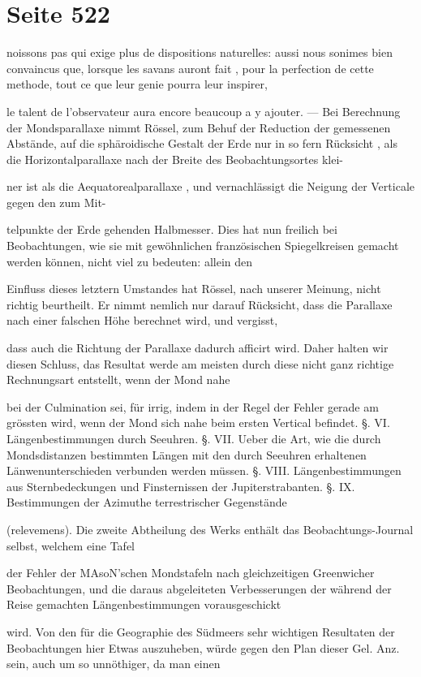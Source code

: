\documentclass[10pt,a4paper]{article}
\begin{document}
\newpage
\section*{Seite 522}
noissons pas qui exige plus de dispositions naturelles: aussi nous sonimes bien convaincus que, lorsque les savans auront fait , pour la perfection de cette methode, tout ce que leur genie pourra leur inspirer,

le talent de l'observateur aura encore beaucoup a y ajouter. — Bei Berechnung der Mondsparallaxe nimmt Rössel, zum Behuf der Reduction der gemessenen Abstände, auf die sphäroidische Gestalt der Erde nur in so fern Rücksicht , als die Horizontalparallaxe nach der Breite des Beobachtungsortes klei-

ner ist als die Aequatorealparallaxe , und vernachlässigt die Neigung der Verticale gegen den zum Mit-

telpunkte der Erde gehenden Halbmesser. Dies hat nun freilich bei Beobachtungen, wie sie mit gewöhnlichen französischen Spiegelkreisen gemacht werden können, nicht viel zu bedeuten: allein den

Einfluss dieses letztern Umstandes hat Rössel, nach unserer Meinung, nicht richtig beurtheilt. Er nimmt nemlich nur darauf Rücksicht, dass die Parallaxe nach einer falschen Höhe berechnet wird, und vergisst,

dass auch die Richtung der Parallaxe dadurch afficirt wird. Daher halten wir diesen Schluss, das Resultat werde am meisten durch diese nicht ganz richtige Rechnungsart entstellt, wenn der Mond nahe

bei der Culmination sei, für irrig, indem in der Regel der Fehler gerade am grössten wird, wenn der Mond sich nahe beim ersten Vertical befindet. §. VI. Längenbestimmungen durch Seeuhren. §. VII. Ueber die Art, wie die durch Mondsdistanzen bestimmten Längen mit den durch Seeuhren erhaltenen Länwenunterschieden verbunden werden müssen. §. VIII. Längenbestimmungen aus Sternbedeckungen und Finsternissen der Jupiterstrabanten. §. IX. Bestimmungen der Azimuthe terrestrischer Gegenstände

(relevemens). Die zweite Abtheilung des Werks enthält das Beobachtungs-Journal selbst, welchem eine Tafel

der Fehler der MAsoN'schen Mondstafeln nach gleichzeitigen Greenwicher Beobachtungen, und die daraus abgeleiteten Verbesserungen der während der Reise gemachten Längenbestimmungen vorausgeschickt

wird. Von den für die Geographie des Südmeers sehr wichtigen Resultaten der Beobachtungen hier Etwas auszuheben, würde gegen den Plan dieser Gel. Anz. sein, auch um so unnöthiger, da man einen
\end{document}
